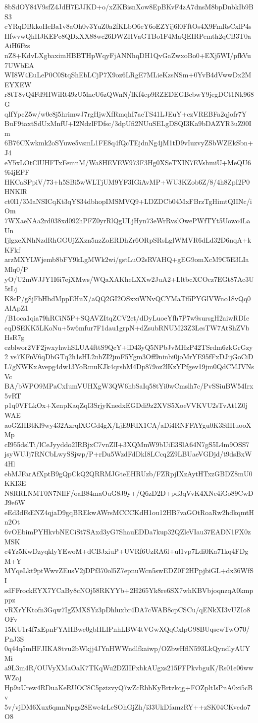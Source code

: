 8bSdOY84V9sfZ4JdH7EJJKD+o/xZKBisnXow8EpBKvF4zA7dnsM8bpDnbkIb9BS3
cYRqDBkkoHeBa1v8aOh0v3YuZ0a2fKLbO6eY6oEZYij6l0FftOs4X9FmRsCxlP4s
HfwvwQhHJKEPc8QDxXX88wc26DWZHVaGTBo1F4MaQEIRPemth2qCB3T0aAiH6Fzs
nZ8+KdvLXgbaximHBBTHpWqyFjANNhqDH1QvGaZwxoBo0+EXj5WI/pfkVu7UWbEA
WI8W4EuLeP0C0StqShEbLCjP7X9oz6LRgE7MLieKzsNSm+0YvB4dVwwDx2MEYXEW
r8tT8vQ4Fd9HWiRt49zU5lncU6zQWnN/lKf4cp9RZEDEGBcbwY9jegDCt1Nk968G
qIfYpcZ5w/w0e8j5hrimwJ7rgHjwXfRmqhI7aeTS41LJEuY+czVREBFa2qjofr7Y
BuF9taxtSdUxMnfU+I2NdzlFDfsc/3dpUfi2NUuSELgDSQI3Ka9bDAZYR3uZ90Im
6B76CXwkmk2oSYuwe5vsmL1FE8q4fQcTEjdnNg4jM1tD9vIuzvyZSbWZEkSbn+J4
eY5xLOtClUHFTxFemnM/Wa8HEVEW973F3Hg0XSeTXIN7EVshmiU+MeQU69i4jEPF
HKCaSPpiV/73+h5SBi5wWLTjUM9YF3IGiAvMP+WU3KZob6Z/8/4h8ZpI2P0HNKlR
ct0l1/3MaNSICqKt3qY834dbhopIMSMVQ9+LDZDCb04MxFBrzTgHimtQIINc/iOm
7WXaeNAa2rd038xd092hPFZ0yrRlQgULjHyn73eWrRvslOwePWfTYt5Uowc4LaUn
IjlgxeXNhNzdRhGGUjZXzn5nzZoERDhZr6ORpSRsLglWMVR6dLd32D6nqA+kKFkf
arzMXYLWjemb8bFY9kLgMWk2wi/gstLuO2sRVAHQ+gEG9omXcM9C5E3LIaMlq0/P
yO/U2mWJJY1I6i7ejXMws/WQaXAKheLXXw2JuA2+LltbcXCOcz7EGt87Ac3U5tLj
K8cP/g8jFbHbdMppEHuX/aQQ2GI2OSxxiWNvQCYMaTf5PYGlVWno18vQq0AlApZ1
/B1oca1qia79hRCiN5P+SQAVZItqZCV2et/dDyLuoeYfh7P7w9sursgH2aiwRDIe
eqDSEKK5LKoNu+5w6mfur7F1dau1grpN+dZsubRNUM23Z3LesTW7AtShZVbHsR7g
ezblwor2VF2jwxyhwhSLUA4fttS9QcY+iD43yQ5NPbJvMHzP42TSrdm6zkGrGzy2
vs7KFnV6qDbGTq2h1sHL2nbZI2jmF5Ygm3Off9ninbi0joMrYE95fFxDJijGoCiD
L7gNWKxAvepg4dw13YoRmuKJk4qrshM4Dp879oz2lKzYPfgev19jm0QdCMJVNsVc
BA/bWPO9MPaCxIumVUHXgW3QW6hbSaIq58tYi0wCmslh7c/PvSSiuBW54Irx5vRT
p1q0VFLkOx+XenpKaqZqI3SrjyKnedxEGDdi9z2XVS5XoeVVKVU2sTvAt1Z0jWAE
aoGZHBtKl9wy432AzrqlXGGd4gX/LjE9FdX1CA/aDi4RNFFAYgu0K3SflHuooXMp
cI955dslTi/lCeJyyddo2IRBjxC7vnZlI+3XQMmW9bUiE3SlA64N7gS5L4m9OSS7
jsyWUJj7RNCbLwySSjwp/P+rDu5WzdFdDkI8LCcq2Z9LBUaeVGDjd/t9dsBxW4Hl
ebMJFarAfXptB9gQpCkQ2QRRMJGteEHRUzb/FZRpjIXzAytHTxzGBDZ8mU0KKI3E
N8RRLNMT0N7NIlF/oaB84maOuG8J9y+/Q6zD2D+pd3qVvK4XNc4iGo89CwDJ9e6W
eEd3dFsENZ4qjaD9gqBREkwAWrsMCCCKdH1ou12HB7vaGOtRoaRw2hdkqmtHn2Ot
6vOEbimPYHkvbNECiSt7SAxd3yG7ShauEDDa7kup32QZleVIau37EADN1FX0zMSK
c4Yz5KwDzyqklyYEwoM+dCBJxiuP+UVRf6UzRA6l+ul1vp7Ldi0Ka71kq4FDgM+Y
MYqeLkt9ptWwvZEusV2jDPf370ol5Z7epnuWcn5swEDZ0F2HPpjbiGL+dx36WfSI
sdFFrockEYX7YCaBy8cNOj58RKYYb+2H265Yk8re6SX7whKBVbjoqnzqA0kmpppz
vRXrYKtofn3Gqw7IgZMXSYz3pDhluxbr4DA7cWAB8cpCSCu/qENkXI3vUZIo8OFv
15KU1r4f7xEpnFYAHBwe0gbHLIPnhLBW4tVGwXQqCxlpG98BUqsewTwO70/PnJ3S
0q44q5mHFJIKA8tvu2bWkjj4JYnHWWndlfkaiwp/OZbwHflN593LkQyndlyAUYMi
a9L3m4R/OUVyXMaOaK7TKqWu2DZIIFxbkAUgxs215FFPkvbguK/Rs01e06wwWZaj
Hp9uUrew4RDuaKeRUOC8C5pzizvyQ7wZcRhbKyBrtzkqg+FOZpltIsPnA0xi5cBv
5v/vjDM6Xux6qmnNpgs28Ewc4rLeSOhGjZh/i33UkDfamzRY++zSK04CKvcdo7O8
